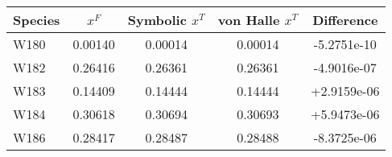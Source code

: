 \begin{tabular}{|l||c||c|c|c|}
\hline
\bf{Species} & \bf{$x^F$} & \bf{Symbolic $x^T$} & \bf{von Halle $x^T$} & \bf{Difference} \\ 
\hline
W180 & 0.00140 & 0.00014 & 0.00014 & -5.2751e-10 \\ 
\hline
W182 & 0.26416 & 0.26361 & 0.26361 & -4.9016e-07 \\ 
\hline
W183 & 0.14409 & 0.14444 & 0.14444 & +2.9159e-06 \\ 
\hline
W184 & 0.30618 & 0.30694 & 0.30693 & +5.9473e-06 \\ 
\hline
W186 & 0.28417 & 0.28487 & 0.28488 & -8.3725e-06 \\ 
\hline
\end{tabular}
